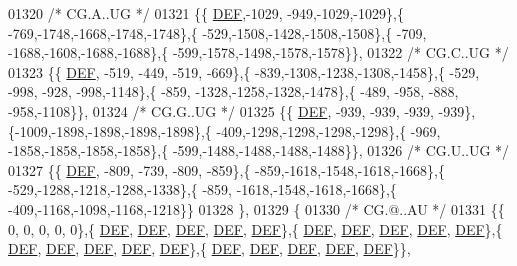 \begin{DoxyCode}
01320 \textcolor{comment}{/* CG.A..UG */}
01321 \{\{  \mbox{\hyperlink{1_88_84__epars_8h_a397419fc12b37ed479c8abb9d444d843}{DEF}},-1029, -949,-1029,-1029\},\{ -769,-1748,-1668,-1748,-1748\},\{ -529,-1508,-1428,-1508,-1508\},\{ -709,
      -1688,-1608,-1688,-1688\},\{ -599,-1578,-1498,-1578,-1578\}\},
01322 \textcolor{comment}{/* CG.C..UG */}
01323 \{\{  \mbox{\hyperlink{1_88_84__epars_8h_a397419fc12b37ed479c8abb9d444d843}{DEF}}, -519, -449, -519, -669\},\{ -839,-1308,-1238,-1308,-1458\},\{ -529, -998, -928, -998,-1148\},\{ -859,
      -1328,-1258,-1328,-1478\},\{ -489, -958, -888, -958,-1108\}\},
01324 \textcolor{comment}{/* CG.G..UG */}
01325 \{\{  \mbox{\hyperlink{1_88_84__epars_8h_a397419fc12b37ed479c8abb9d444d843}{DEF}}, -939, -939, -939, -939\},\{-1009,-1898,-1898,-1898,-1898\},\{ -409,-1298,-1298,-1298,-1298\},\{ -969,
      -1858,-1858,-1858,-1858\},\{ -599,-1488,-1488,-1488,-1488\}\},
01326 \textcolor{comment}{/* CG.U..UG */}
01327 \{\{  \mbox{\hyperlink{1_88_84__epars_8h_a397419fc12b37ed479c8abb9d444d843}{DEF}}, -809, -739, -809, -859\},\{ -859,-1618,-1548,-1618,-1668\},\{ -529,-1288,-1218,-1288,-1338\},\{ -859,
      -1618,-1548,-1618,-1668\},\{ -409,-1168,-1098,-1168,-1218\}\}
01328 \},
01329 \{
01330 \textcolor{comment}{/* CG.@..AU */}
01331 \{\{    0,    0,    0,    0,    0\},\{  \mbox{\hyperlink{1_88_84__epars_8h_a397419fc12b37ed479c8abb9d444d843}{DEF}},  \mbox{\hyperlink{1_88_84__epars_8h_a397419fc12b37ed479c8abb9d444d843}{DEF}},  \mbox{\hyperlink{1_88_84__epars_8h_a397419fc12b37ed479c8abb9d444d843}{DEF}},  \mbox{\hyperlink{1_88_84__epars_8h_a397419fc12b37ed479c8abb9d444d843}{DEF}},  \mbox{\hyperlink{1_88_84__epars_8h_a397419fc12b37ed479c8abb9d444d843}{DEF}}\},\{  
      \mbox{\hyperlink{1_88_84__epars_8h_a397419fc12b37ed479c8abb9d444d843}{DEF}},  \mbox{\hyperlink{1_88_84__epars_8h_a397419fc12b37ed479c8abb9d444d843}{DEF}},  \mbox{\hyperlink{1_88_84__epars_8h_a397419fc12b37ed479c8abb9d444d843}{DEF}},  \mbox{\hyperlink{1_88_84__epars_8h_a397419fc12b37ed479c8abb9d444d843}{DEF}},  \mbox{\hyperlink{1_88_84__epars_8h_a397419fc12b37ed479c8abb9d444d843}{DEF}}\},\{  \mbox{\hyperlink{1_88_84__epars_8h_a397419fc12b37ed479c8abb9d444d843}{DEF}},  \mbox{\hyperlink{1_88_84__epars_8h_a397419fc12b37ed479c8abb9d444d843}{DEF}},  \mbox{\hyperlink{1_88_84__epars_8h_a397419fc12b37ed479c8abb9d444d843}{DEF}},  \mbox{\hyperlink{1_88_84__epars_8h_a397419fc12b37ed479c8abb9d444d843}{DEF}},  
      \mbox{\hyperlink{1_88_84__epars_8h_a397419fc12b37ed479c8abb9d444d843}{DEF}}\},\{  \mbox{\hyperlink{1_88_84__epars_8h_a397419fc12b37ed479c8abb9d444d843}{DEF}},  \mbox{\hyperlink{1_88_84__epars_8h_a397419fc12b37ed479c8abb9d444d843}{DEF}},  \mbox{\hyperlink{1_88_84__epars_8h_a397419fc12b37ed479c8abb9d444d843}{DEF}},  \mbox{\hyperlink{1_88_84__epars_8h_a397419fc12b37ed479c8abb9d444d843}{DEF}},  \mbox{\hyperlink{1_88_84__epars_8h_a397419fc12b37ed479c8abb9d444d843}{DEF}}\}\},

\end{DoxyCode}
